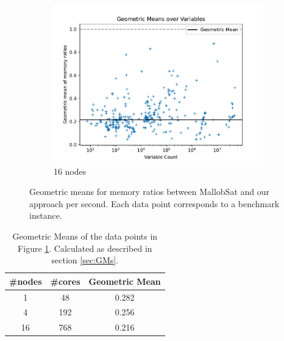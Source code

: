 \documentclass[12pt,a4paper,twoside]{scrartcl}
\numberwithin{equation}{section}
\begin{document}
\begin{figure}[!h]
\begin{subfigure}[c]{.45\textwidth}
    \includegraphics[scale=.45]{plots/16node_compare/mem_gm_over_vars.pdf}
    \caption{16 nodes}
  \end{subfigure}
  \caption{Geometric means for memory ratios between MallobSat and our approach per second. Each data point corresponds to a benchmark instance.}
  \label{fig:memGmVars}
\end{figure}

\begin{table}[!h]
  \center
  \begin{tabular}{ ccc }
    \toprule
    \#nodes & \#cores & Geometric Mean \\
    \midrule
    1  & 48  & 0.282\\
    4  & 192 & 0.256\\
    16 & 768 & 0.216\\
    \bottomrule
  \end{tabular}
  \caption{Geometric Means of the data points in Figure \ref{fig:memGmVars}. Calculated as described in section \ref{sec:GMs}.}
  \label{tab:memGM}
\end{table}
\end{document}
